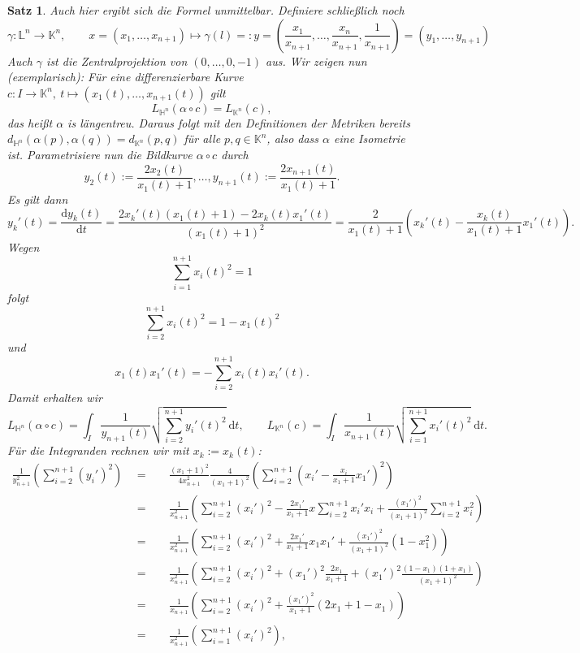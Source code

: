 \documentclass[11pt]{book}
\numberwithin{dummy}{section}
\newtheorem{theorem}{Satz}[section]
\theoremstyle{nonumberbreak}
\newenvironment{pr}[1][]{\ifthenelse{\equal{#1}{}}{\proof}{\proof[#1]}\rm}{\endproof}
\newcommand{\Loid}{\mathbb{L}}
\newcommand{\He}{\mathbb{H}}
\newcommand{\KK}{\mathbb{K}}
\newcommand{\la}{\longrightarrow}
\begin{document}
\begin{spacing}{1.4}
\begin{theorem}
\begin{pr}
Auch hier ergibt sich die Formel unmittelbar. Definiere schließlich noch
$$\gamma: \Loid^n \la \KK^n, \qquad x=(x_1, \ldots, x_{n+1}) \mapsto  \gamma(l)=:y= \left( \frac{x_1}{x_{n+1}}, \ldots, \frac{x_n}{x_{n+1}}, \frac{1}{x_{n+1}} \right)=(y_1, \ldots, y_{n+1})$$
Auch $\gamma$ ist die Zentralprojektion von $(0,\ldots, 0 ,-1)$ aus. Wir zeigen nun (exemplarisch): Für eine differenzierbare Kurve $c: I \la \KK^n, \ t \mapsto (x_1(t), \ldots, x_{n+1}(t))$ gilt
$$L_{\He^n}(\alpha \circ c) = L_{\KK^n}(c),$$
das heißt $\alpha$ is längentreu. Daraus folgt mit den Definitionen der Metriken bereits $d_{\He^n}(\alpha(p), \alpha(q)) = d_{\KK^n}(p,q)$ für alle $p,q \in \KK^n$, also dass $\alpha$ eine Isometrie ist. Parametrisiere nun die Bildkurve $\alpha \circ c$ durch 
$$y_2(t) := \frac{2 x_2(t)}{x_1(t) +1},\ldots, y_{n+1}(t) := \frac{2 x_{n+1}(t)}{x_1(t)+1}.$$
Es gilt dann 
$$y_k'(t) = \frac{ \mathrm{d} y_k(t)}{\mathrm{d}t} = \frac{2 x_k'(t) (x_1(t) + 1) - 2 x_k(t) x_1'(t)}{(x_1(t)+1)^2} = \frac{2}{x_1(t)+1} \left( x_k'(t) - \frac{x_k(t)}{x_1(t)+1} x_1'(t) \right).$$
Wegen
$$\sum_{i=1}^{n+1} x_i(t)^2 = 1$$
folgt
$$\sum_{i=2}^{n+1} x_i(t)^2 = 1 - x_1(t)^2$$
und
$$x_1(t) x_1'(t) = - \sum_{i=2}^{n+1} x_i(t) x_i'(t).$$
Damit erhalten wir
$$L_{\He^n}(\alpha \circ c) = \int_I \frac{1}{y_{n+1}(t)} \sqrt{ \sum_{i=2}^{n+1} y_i'(t)^2} \ \mathrm{d}t, \qquad L_{\KK^n}(c) = \int_I \frac{1}{x_{n+1}(t)} \sqrt{ \sum_{i=1}^{n+1} x_i'(t)^2} \ \mathrm{d}t.$$
Für die Integranden rechnen wir mit $x_k:= x_k(t)$:
\begin{alignat*}{5}
\frac{1}{y_{n+1}^2} \left( \sum_{i=2}^{n+1} (y_i')^2 \right) \ \ &=&& \ \ \frac{(x_1+1)^2}{4 x_{n+1}^2}  \frac{4}{(x_1+1)^2} \left( \sum_{i=2}^{n+1} \left( x_i' - \frac{x_i}{x_1+1} x_1'\right)^2 \right) \\
&=&& \ \ \frac{1}{x_{n+1}^2} \left(  \sum_{i=2}^{n+1} (x_i')^2 - \frac{2x_1'}{x_1+1} x \sum_{i=2}^{n+1} x_i' x_i + \frac{(x_1')^2}{(x_1+1)^2} \sum_{i=2}^{n+1} x_i^2 \right) \\
&=&& \ \ \frac{1}{x_{n+1}^2} \left( \sum_{i=2}^{n+1} (x_i')^2 + \frac{2x_1'}{x_1+1} x_1 x_1' + \frac{(x_1')^2}{(x_1+1)^2} (1-x_1^2) \right) \\
&=&& \ \ \frac{1}{x_{n+1}^2} \left( \sum_{i=2}^{n+1} (x_i')^2 + (x_1')^2 \frac{2x_1}{x_1+1} + (x_1')^2 \frac{(1-x_1)(1+x_1)}{(x_1+1)^2} \right) \\
&=&& \ \ \frac{1}{x_{n+1}} \left( \sum_{i=2}^{n+1} (x_i')^2 + \frac{(x_1')^2}{x_1+1} \left( 2x_1+1-x_1\right) \right) \\
&=&& \ \ \frac{1}{x_{n+1}^2} \left( \sum_{i=1}^{n+1} (x_i')^2 \right),
\end{alignat*}


\end{pr}
\end{theorem}
\end{spacing}
\end{document}

